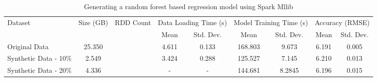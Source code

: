 \begin{table*}
    \renewcommand{\arraystretch}{1.3}
    \caption{Generating a random forest based regression model using Spark Mllib}
    \label{tab:resource-util}
    \begin{center}
        \begin{tabularx}{0.98\textwidth}{|X|c|X|c|c|c|c|c|c|}
            \hline
            \multirow{2}{*}{Dataset} & \multirow{2}{*}{Size (GB)} & \multirow{2}{*}{RDD Count} & \multicolumn{2}{c|}{\cellcolor[gray]{0.7}Data Loading Time (s)} &\multicolumn{2}{c|}{\cellcolor[gray]{0.7}Model Training Time (s)} & \multicolumn{2}{c|}{\cellcolor[gray]{0.7}Accuracy (RMSE)}\\
            \cline{4-9}
             & & & \cellcolor[gray]{0.9}Mean & \cellcolor[gray]{0.9}Std. Dev.  &  \cellcolor[gray]{0.9}Mean & \cellcolor[gray]{0.9}Std. Dev. &  \cellcolor[gray]{0.9}Mean & \cellcolor[gray]{0.9}Std. Dev. \\
            \hline
            Original Data & 25.350 & & 4.611 & 0.133 & 168.803 & 9.673 & 6.191 & 0.005 \\
            \hline
            Synthetic Data - 10\% & 2.549 & & 3.424 & 0.288 & 125.527 & 7.145 & 6.210 & 0.013 \\
            \hline
            Synthetic Data - 20\% & 4.336 & & - & - & 144.681 & 8.2845 & 6.196 & 0.015 \\
            \hline
		\end{tabularx}
	\end{center}
\end{table*}
